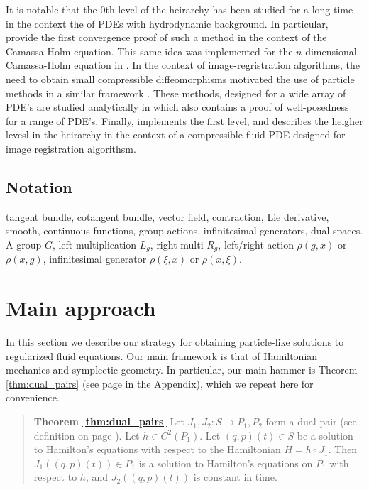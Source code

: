\documentclass[12pt]{amsart}
\begin{document}
 It is notable that the $0$th level of the heirarchy has been studied
 for a long time in the context the of PDEs with hydrodynamic background.
 In particular, \cite{HoldenRaynaud2006} provide the first convergence proof of such a method in the context of the Camassa-Holm equation.
 This same idea was implemented for the $n$-dimensional Camassa-Holm
 equation in \cite{ChertockDuToitMarsden2012}.
 In the context of image-regristration algorithms, the need to obtain 
 small compressible diffeomorphisms motivated the use of particle methods
 in a similar framework \cite{JoshiMiller2000}.
 These methods, designed for a wide array of PDE's are studied analytically
 in \cite{TrouveYounes2005} which also contains a proof of well-posedness
 for a range of PDE's.
 Finally, \cite{Sommer2013} implements the first level, and
 describes the heigher levesl in the heirarchy  in the context of a 
 compressible fluid PDE designed for image registration algorithsm.

\subsection{Notation}
tangent bundle, cotangent bundle, vector field, contraction, Lie derivative,
smooth, continuous functions, group actions, infinitesimal generators,
dual spaces.  A group $G$, left multiplication $L_g$, right multi $R_g$, 
left/right action $\rho(g,x)$ or $\rho(x,g)$, infinitesimal generator $\rho(\xi,x)$ or $\rho(x,\xi)$.



\section{Main approach}
\label{sec:approach}
In this section we describe our strategy for obtaining
particle-like solutions to regularized fluid equations.
Our main framework is that of Hamiltonian mechanics
and symplectic geometry.
In particular, our main hammer is Theorem \ref{thm:dual_pairs} (see page 
\pageref{thm:dual_pairs} in the Appendix), which we repeat
here for convenience.

  \begin{quote}
    {\bf Theorem \ref{thm:dual_pairs}}
    Let $J_1,J_2:S \to P_1,P_2$ form a dual pair 
    (see definition on page \pageref{thm:dual_pairs}).
    Let $h \in C^2(P_1)$.
    Let $(q,p)(t) \in S$ be a solution to Hamilton's equations
    with respect to the Hamiltonian $H = h \circ J_1$.
    Then $J_1\left( (q,p)(t) \right) \in P_1$ is a solution
    to Hamilton's equations on $P_1$ with respect to $h$,
    and $J_2( (q,p)(t))$ is constant in time.
  \end{quote}
\end{document}
